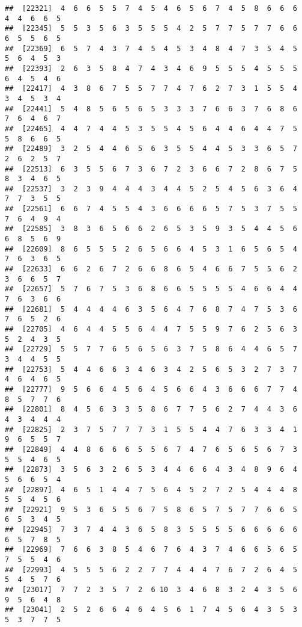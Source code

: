 \documentclass[
]{book}
\begin{document}
\begin{verbatim}
##  [22321]  4  6  6  5  5  7  4  5  4  6  5  6  7  4  5  8  6  6  6  4  4  6  6  5
##  [22345]  5  5  3  5  6  3  5  5  5  4  2  5  7  7  5  7  7  6  6  6  5  5  6  5
##  [22369]  6  5  7  4  3  7  4  5  4  5  3  4  8  4  7  3  5  4  5  5  6  4  5  3
##  [22393]  2  6  3  5  8  4  7  4  3  4  6  9  5  5  5  4  5  5  5  6  4  5  4  6
##  [22417]  4  3  8  6  7  5  5  7  7  4  7  6  2  7  3  1  5  5  4  3  4  5  3  4
##  [22441]  5  4  8  5  6  5  6  5  3  3  3  7  6  6  3  7  6  8  6  7  6  4  6  7
##  [22465]  4  4  7  4  4  5  3  5  5  4  5  6  4  4  6  4  4  7  5  5  8  6  6  5
##  [22489]  3  2  5  4  4  6  5  6  3  5  5  4  4  5  3  3  6  5  7  2  6  2  5  7
##  [22513]  6  3  5  5  6  7  3  6  7  2  3  6  6  7  2  8  6  7  5  8  3  4  6  5
##  [22537]  3  2  3  9  4  4  4  3  4  4  5  2  5  4  5  6  3  6  4  7  7  3  5  5
##  [22561]  6  6  7  4  5  5  4  3  6  6  6  6  5  7  5  3  7  5  5  7  6  4  9  4
##  [22585]  3  8  3  6  5  6  6  2  6  5  3  5  9  3  5  4  4  5  6  6  8  5  6  9
##  [22609]  8  6  5  5  5  2  6  5  6  6  4  5  3  1  6  5  6  5  4  7  6  3  6  5
##  [22633]  6  6  2  6  7  2  6  6  8  6  5  4  6  6  7  5  5  6  2  3  6  6  5  7
##  [22657]  5  7  6  7  5  3  6  8  6  6  5  5  5  5  4  6  6  4  4  7  6  3  6  6
##  [22681]  5  4  4  4  4  6  3  5  6  4  7  6  8  7  4  7  5  3  6  7  6  5  2  6
##  [22705]  4  6  4  4  5  5  6  4  4  7  5  5  9  7  6  2  5  6  3  5  2  4  3  5
##  [22729]  5  5  7  7  6  5  6  5  6  3  7  5  8  6  4  4  6  5  7  3  4  4  5  5
##  [22753]  5  4  4  6  6  3  4  6  3  4  2  5  6  5  3  2  7  3  7  4  6  4  6  5
##  [22777]  9  5  6  6  4  5  6  4  5  6  6  4  3  6  6  6  7  7  4  8  5  7  7  6
##  [22801]  8  4  5  6  3  3  5  8  6  7  7  5  6  2  7  4  4  3  6  4  3  4  4  4
##  [22825]  2  3  7  5  7  7  7  3  1  5  5  4  4  7  6  3  3  4  1  9  6  5  5  7
##  [22849]  4  4  8  6  6  6  5  5  6  7  4  7  6  5  6  5  6  7  3  5  5  4  6  5
##  [22873]  3  5  6  3  2  6  5  3  4  4  6  6  4  3  4  8  9  6  4  5  6  6  5  4
##  [22897]  4  6  5  1  4  4  7  5  6  4  5  2  7  2  5  4  4  4  8  5  5  4  5  6
##  [22921]  9  5  3  6  5  5  6  7  5  8  6  5  7  5  7  7  6  6  5  6  5  3  4  5
##  [22945]  7  3  7  4  4  3  6  5  8  3  5  5  5  5  6  6  6  6  6  6  5  7  8  5
##  [22969]  7  6  6  3  8  5  4  6  7  6  4  3  7  4  6  6  5  6  5  7  5  5  4  6
##  [22993]  4  5  5  5  6  2  2  7  7  4  4  4  7  6  7  2  6  4  5  5  4  5  7  6
##  [23017]  7  7  2  3  5  7  2  6 10  3  4  6  8  3  2  4  3  5  6  9  5  6  4  8
##  [23041]  2  5  2  6  6  4  6  4  5  6  1  7  4  5  6  4  3  5  3  5  3  7  7  5

\end{verbatim}
\end{document}
